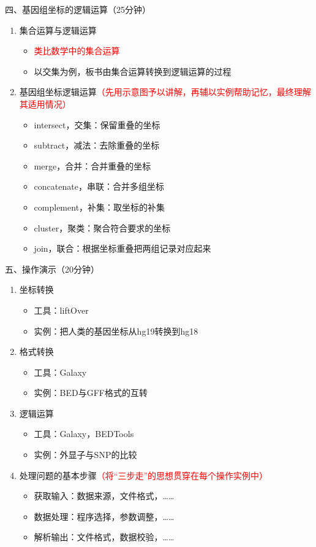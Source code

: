 \documentclass{TIJMUjiaoanLL}
\begin{document}
\noindent
四、基因组坐标的逻辑运算（25分钟）
\begin{enumerate}
  \item 集合运算与逻辑运算
    \begin{itemize}
      \item \textcolor{red}{类比数学中的集合运算}
      \item 以交集为例，板书由集合运算转换到逻辑运算的过程
    \end{itemize}
  \item 基因组坐标逻辑运算\textcolor{red}{（先用示意图予以讲解，再辅以实例帮助记忆，最终理解其适用情况）}
    \begin{itemize}
      \item intersect，交集：保留重叠的坐标
      \item subtract，减法：去除重叠的坐标
      \item merge，合并：合并重叠的坐标
      \item concatenate，串联：合并多组坐标
      \item complement，补集：取坐标的补集
      \item cluster，聚类：聚合符合要求的坐标
      \item join，联合：根据坐标重叠把两组记录对应起来
    \end{itemize}
\end{enumerate}

\noindent
五、操作演示（20分钟）
\begin{enumerate}
  \item 坐标转换
    \begin{itemize}
      \item 工具：liftOver
      \item 实例：把人类的基因坐标从hg19转换到hg18
    \end{itemize}
  \item 格式转换
    \begin{itemize}
      \item 工具：Galaxy
      \item 实例：BED与GFF格式的互转
    \end{itemize}
  \item 逻辑运算
    \begin{itemize}
      \item 工具：Galaxy，BEDTools
      \item 实例：外显子与SNP的比较
    \end{itemize}
  \item 处理问题的基本步骤\textcolor{red}{（将“三步走”的思想贯穿在每个操作实例中）}
    \begin{itemize}
      \item 获取输入：数据来源，文件格式，……
      \item 数据处理：程序选择，参数调整，……
      \item 解析输出：文件格式，数据校验，……
    \end{itemize}
\end{enumerate}
\end{document}

